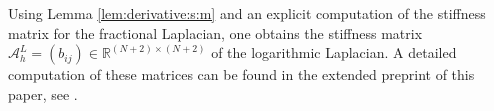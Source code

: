 \documentclass[11 pt]{article}
\newcommand\inter[1]{\llbracket #1\rrbracket}
\numberwithin{equation}{section}
\def\R{\mathbb{R}}
\begin{document}
%
%



Using Lemma \ref{lem:derivative:s:m} and an explicit computation of the stiffness matrix for the fractional Laplacian, one obtains the stiffness matrix $\mathcal A_{h}^{L}=(b_{ij})\in{\R^{(N+2)\times(N+2)}}$ of the logarithmic Laplacian. A detailed computation of these matrices can be found in the extended preprint of this paper, see \cite[Section 5]{HSJSS23}.
\end{document}
